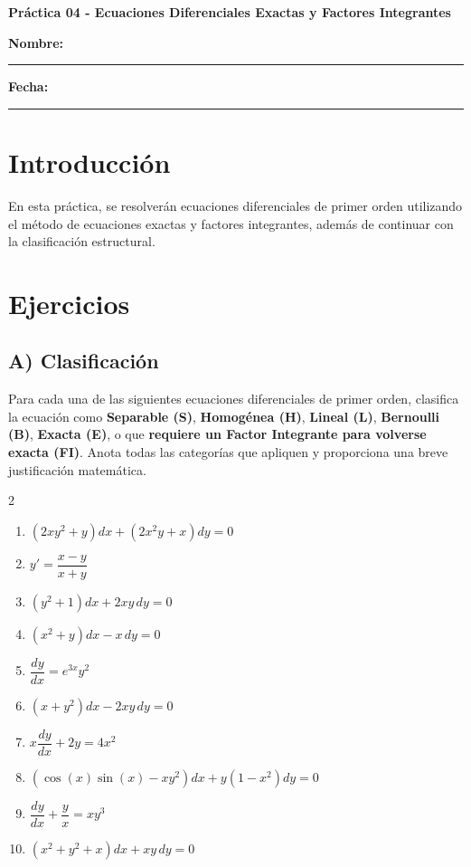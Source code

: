 \documentclass[a4paper,11pt]{article}
\begin{document}
\begin{center}
    \Large\textbf{Práctica 04 - Ecuaciones Diferenciales Exactas y Factores Integrantes}\\[0.5cm]  

\end{center}
  \textbf{Nombre:} \rule{9cm}{0.4pt}  \textbf{Fecha:} \rule{4.5cm}{0.4pt}

\section*{Introducción}
En esta práctica, se resolverán ecuaciones diferenciales de primer orden utilizando el método de ecuaciones exactas y factores integrantes, además de continuar con la clasificación estructural.

\section*{Ejercicios}

\subsection*{A) Clasificación}
Para cada una de las siguientes ecuaciones diferenciales de primer orden, clasifica la ecuación como \textbf{Separable (S)}, \textbf{Homogénea (H)}, \textbf{Lineal (L)}, \textbf{Bernoulli (B)}, \textbf{Exacta (E)}, o que \textbf{requiere un Factor Integrante para volverse exacta (FI)}. Anota todas las categorías que apliquen y proporciona una breve justificación matemática.

\begin{multicols}{2}
\begin{enumerate}[itemsep=0.1cm]
    \item $(2xy^2 + y)dx + (2x^2y + x)dy = 0$
    \item $y' = \dfrac{x-y}{x+y}$
    \item $(y^2 + 1)dx + 2xy\,dy = 0$
    \item $(x^2 + y)dx - x\,dy = 0$
    \item $\dfrac{dy}{dx} = e^{3x} y^2$
    \item $(x + y^2)dx - 2xy\,dy = 0$
    \item $x \dfrac{dy}{dx} + 2y = 4x^2$
    \item $(\cos(x)\sin(x) - xy^2)dx + y(1-x^2)dy = 0$
    \item $\dfrac{dy}{dx} + \dfrac{y}{x} = x y^3$
    \item $(x^2 + y^2 + x)dx + xy\,dy = 0$
\end{enumerate}
\end{multicols}
\end{document}
